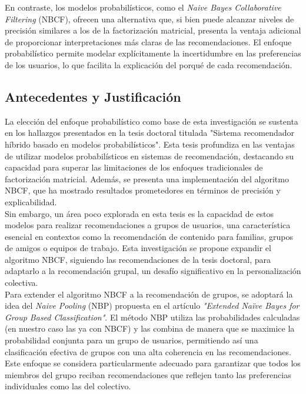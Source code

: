 \documentclass[runningheads,a4paper]{llncs}
\begin{document}
En contraste, los modelos probabilísticos, 
como el \textit{Naive Bayes Collaborative Filtering} (NBCF), 
ofrecen una alternativa que, si bien puede alcanzar 
niveles de precisión similares a los de la 
factorización matricial, presenta la ventaja adicional 
de proporcionar interpretaciones más claras de las 
recomendaciones. El enfoque probabilístico permite 
modelar explícitamente la incertidumbre en las 
preferencias de los usuarios, lo que facilita la 
explicación del porqué de cada recomendación.

\subsection{Antecedentes y Justificación}

La elección del enfoque probabilístico como base de 
esta investigación se sustenta en los hallazgos 
presentados en la tesis doctoral titulada 
"Sistema recomendador híbrido basado en modelos 
probabilísticos". Esta tesis profundiza en las ventajas 
de utilizar modelos probabilísticos en sistemas de 
recomendación, destacando su capacidad para superar 
las limitaciones de los enfoques tradicionales de 
factorización matricial. Además, se presenta una 
implementación del algoritmo NBCF, que ha mostrado 
resultados prometedores en términos de precisión y 
explicabilidad.\\

Sin embargo, un área poco explorada en esta tesis es 
la capacidad de estos modelos para realizar 
recomendaciones a grupos de usuarios, una 
característica esencial en contextos como la 
recomendación de contenido para familias, grupos de 
amigos o equipos de trabajo. Esta investigación se 
propone expandir el algoritmo NBCF, siguiendo las 
recomendaciones de la tesis doctoral, para adaptarlo 
a la recomendación grupal, un desafío significativo 
en la personalización colectiva.\\

Para extender el algoritmo NBCF a la recomendación de 
grupos, se adoptará la idea del \textit{Naive Pooling} (NBP) 
propuesta en el artículo \textit{"Extended Naïve Bayes for 
Group Based Classification"}\cite{nbp}. El método NBP utiliza 
las probabilidades calculadas (en nuestro caso las ya 
con NBCF) y las 
combina de manera que se maximice la probabilidad 
conjunta para un grupo de usuarios, permitiendo así 
una clasificación efectiva de grupos con una alta 
coherencia en las recomendaciones. Este enfoque se 
considera particularmente adecuado para garantizar 
que todos los miembros del grupo reciban 
recomendaciones que reflejen tanto las preferencias 
individuales como las del colectivo.
\end{document}
